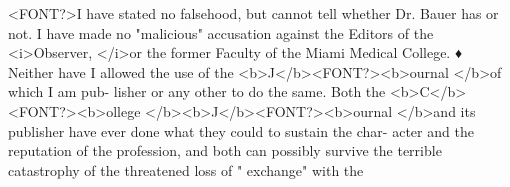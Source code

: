 <FONT?>I have stated no falsehood, but cannot tell whether Dr. Bauer has
or not. I have made no "malicious" accusation against the Editors of
the <i>Observer, </i>or the former Faculty of the Miami Medical College. ♦
Neither have I allowed the use of the <b>J</b><FONT?><b>ournal </b>of which I am pub-
lisher or any other to do the same. Both the <b>C</b><FONT?><b>ollege </b><b>J</b><FONT?><b>ournal </b>and
its publisher have ever done what they could to sustain the char-
acter and the reputation of the profession, and both can possibly survive
the terrible catastrophy of the threatened loss of " exchange" with the\endinput
